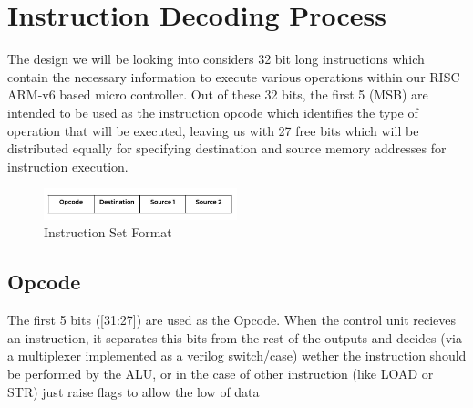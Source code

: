 \documentclass[9pt,a4paper,twoside]{tau}
\begin{document}
        \section{Instruction Decoding Process}


        The design we will be looking into considers 32 bit long instructions which contain the necessary information to execute various operations within our RISC ARM-v6 based micro controller. Out of these 32 bits, the first 5 (MSB) are intended to be used as the instruction opcode which identifies the type of operation that will be executed, leaving us with 27 free bits which will be distributed equally for specifying destination and source memory addresses for instruction execution. 

        \begin{figure}[h]  %
            \centering  %
            \includegraphics[width=0.5\textwidth]{images/ISA.JPG}
            \caption{Instruction Set Format}
            \label{fig:ISA Format}
        \end{figure}

        \subsection{Opcode}
        The first 5 bits ([31:27]) are used as the Opcode. When the control unit recieves an instruction, it separates this bits from the rest of the outputs and decides (via a multiplexer implemented as a verilog switch/case) wether the instruction should be performed by the ALU, or in the case of other instruction (like LOAD or STR) just raise flags to allow the low of data
\end{document}
